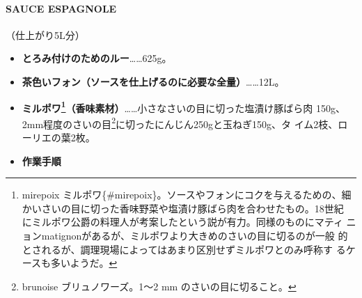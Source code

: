 \documentclass[twoside,12Q,b5j]{escoffierltjsbook}
\begin{document}
\paragraph{SAUCE ESPAGNOLE}\label{sauce-espagnole}


（仕上がり5L分）

\begin{itemize}
\item
  \textbf{とろみ付けのためのルー}\ldots{}\ldots{}625g。
\item
  \textbf{茶色いフォン（ソースを仕上げるのに必要な全量）}\ldots{}\ldots{}12L。
\item
  \textbf{ミルポワ\footnote{mirepoix
    ミルポワ\{\#mirepoix\}。ソースやフォンにコクを与えるための、細
    かいさいの目に切った香味野菜や塩漬け豚ばら肉を合わせたもの。18世紀
    にミルポワ公爵の料理人が考案したという説が有力。同様のものにマティ
    ニョンmatignonがあるが、ミルポワより大きめのさいの目に切るのが一般
    的とされるが、調理現場によってはあまり区別せずミルポワとのみ呼称す
    るケースも多いようだ。}（香味素材）}\ldots{}\ldots{}小さなさいの目に切った塩漬け豚ばら肉
  150g、2mm程度のさいの目\footnote{brunoise ブリュノワーズ。1〜2 mm
    のさいの目に切ること。}に切ったにんじん250gと玉ねぎ150g、タ
  イム2枝、ローリエの葉2枚。
\item
  \textbf{作業手順}
\end{itemize}
\end{document}
